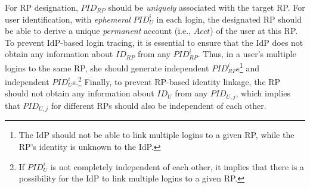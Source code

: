 
For RP designation, $PID_{RP}$ should be \emph{uniquely} associated with the target RP.
For user identification, with \emph{ephemeral} $PID_{U}^i$ in each login, the designated RP should be able to derive a unique \emph{permanent} account  (i.e., $Acct$) of the user at this RP.
To prevent IdP-based login tracing, it is essential to ensure that the IdP does not obtain any information about $ID_{RP}$ from any $PID_{RP}^i$.
Thus, in a user's multiple logins to the same RP, she should generate independent $PID_{RP}^i$s\footnote{The IdP should not be able to link multiple logins to a given RP, while the RP's identity is unknown to the IdP.} %
and independent $PID_U^i$s.\footnote{If $PID_U^i$ is not completely independent of each other, it implies that there is a possibility for the IdP to link multiple logins to a given RP.}
Finally, to prevent RP-based identity linkage,
the RP should not obtain any information about $ID_U$ from any $PID_{U,j}$, which implies that $PID_{U,j}$ for different RPs should also be independent of each other.
\oldc

